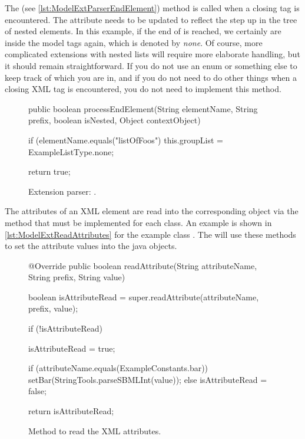 The  (see \vref{lst:ModelExtParserEndElement}) 
method is called when a closing tag is
encountered.  The  attribute needs to be updated to reflect the step
up in the tree of nested elements.  In this example, if the end of
 is reached, we certainly are inside the model tags
again, which is denoted by \emph{none}.  Of course, more complicated
extensions with nested lists will require more elaborate handling, but it
should remain straightforward. If you do not use an enum or something else to
keep track of which  you are in, and if you do not need to do other
things when a closing XML tag is encountered, you do not need to implement this method.

\begin{figure}[htb]
  \begin{example}[numbers=left]
public boolean processEndElement(String elementName, String prefix,
  boolean isNested, Object contextObject) {

  if (elementName.equals("listOfFoos") {
    this.groupList = ExampleListType.none;
  }

  return true;
}\end{example}
  \caption{Extension parser: .}
  \label{lst:ModelExtParserEndElement}
\end{figure}

The attributes of an XML element are read into the corresponding object via
the  method that must be implemented for each class.
An example is shown in \vref{lst:ModelExtReadAttributes} for the example class
. The  will use these methods to set
the attribute values into the java objects.

\begin{figure}[htb]
  \begin{example}[numbers=left]
@Override
public boolean readAttribute(String attributeName, String prefix, String value) {

  boolean isAttributeRead = super.readAttribute(attributeName, prefix, value);

  if (!isAttributeRead) {
    isAttributeRead = true;

    if (attributeName.equals(ExampleConstants.bar)) {
      setBar(StringTools.parseSBMLInt(value));
    } else {
      isAttributeRead = false;
    }
  }

  return isAttributeRead;
}\end{example}
  \caption{Method to read the XML attributes.}
  \label{lst:ModelExtReadAttributes}
\end{figure}


